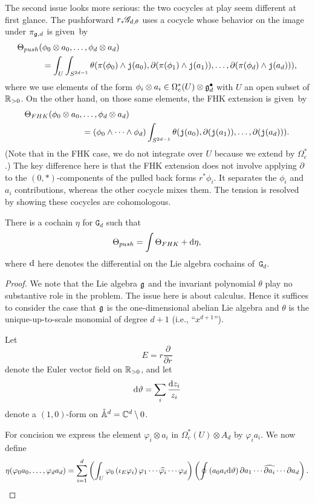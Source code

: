 The second issue looks more serious:
the two cocycles at play seem different at first glance.
The pushforward $r_* \mathscr G_{d,\theta}$ uses a cocycle whose behavior on the image under $\pi_{\mathfrak g, d}$ is given~by
\begin{align*}
\Theta_{push}(&\phi_0 \otimes a_0, \ldots, \phi_d \otimes a_d) \\
&= \int_U \int_{S^{2d-1}} \theta(\pi(\phi_0) \wedge {\mathtt{j}}(a_0),\partial (\pi(\phi_1) \wedge {\mathtt{j}}(a_1)),\ldots,\partial(\pi(\phi_d) \wedge {\mathtt{j}}(a_d))),
\end{align*}
where we use  elements of the form $\phi_i \otimes a_i \in \Omega^*_c(U) \otimes \mathfrak g^\bullet_d$ with $U$ an open subset of $\mathbb R_{>0}$.
On the other hand, on those same elements, the FHK extension is given~by
\begin{align*}
\Theta_{FHK}(\phi_0 \otimes a_0, &\ldots, \phi_d \otimes a_d) \\
&= (\phi_0 \wedge \cdots \wedge \phi_d) \int_{S^{2d-1}} \theta({\mathtt{j}}(a_0),\partial ({\mathtt{j}}(a_1)),\ldots,\partial({\mathtt{j}}(a_d))).
\end{align*}
(Note that in the FHK case, we do not integrate over $U$ because we extend by $\Omega^*_c$.)
The key difference here is that the FHK extension does not involve applying $\partial$ to the $(0,*)$-components of the pulled back forms $r^* \phi_i$.
It separates the $\phi_i$ and $a_i$ contributions,
whereas the other cocycle mixes them.
The tension is resolved by showing these cocycles are cohomologous.

\begin{lem}
There is a cochain $\eta$ for $\mathtt{G}_d$ such that
\[
\Theta_{push} = \int \Theta_{FHK} + {\rm d} \eta,
\]
where ${\rm d}$ here denotes the differential on the Lie algebra cochains of~$\mathtt{G}_d$.
\end{lem}

\begin{proof}
We note that the Lie algebra $\mathfrak g$ and the invariant polynomial $\theta$ play no substantive role in the problem.
The issue here is about calculus.
Hence it suffices to consider the case that $\mathfrak g$ is the one-dimensional abelian Lie algebra and $\theta$ is the unique-up-to-scale monomial of degree $d+1$ (i.e., ``$x^{d+1}$'').

Let
\[
E = r \frac{\partial}{\partial r}
\]
denote the Euler vector field on $\mathbb R_{>0}$,
and let
\[
{\rm d} \vartheta = \sum_i \frac{{\rm d} z_i}{z_i} 
\]
denote a $(1,0)$-form on $\mathring{\mathbb A}^d = \mathbb C^{d} \setminus 0$. 

For concision we express the element $\varphi_i \otimes a_i $ in $\Omega^*_c(U) \otimes A_d $ by $\varphi_i a_i$.
We now define
\[
\eta(\varphi_0 a_0,\ldots,\varphi_da_d) = \sum_{i=1}^d \left(\int_U \varphi_0 \left(\iota_{E} \varphi_i \right) \varphi_1 \cdots \widehat{\varphi_i} \cdots \varphi_d\right)\left(\oint \left(a_0 a_i {\rm d} \vartheta\right) \partial a_1 \cdots \widehat{\partial a_i} \cdots \partial a_d \right)  .
\]
\end{proof}

